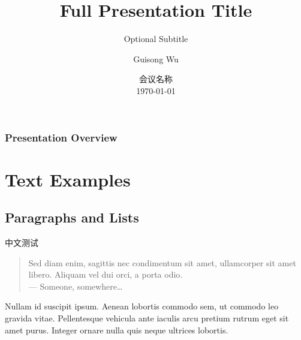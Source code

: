 \documentclass[11pt]{beamer}
\title[Short Title]{Full Presentation Title}
\subtitle{Optional Subtitle}
\author[Guisong Wu]{Guisong Wu}
\institute[AMSS]{数学与系统科学研究院 \\ \smallskip \textit{wuguisong@lsec.cc.ac.cn}}
\date[\today]{会议名称 \\ \today}
\begin{document}



\begin{frame}
	\titlepage
\end{frame}



\begin{frame}
	\frametitle{Presentation Overview}
	\tableofcontents
\end{frame}



\section{Text Examples}
\subsection{Paragraphs and Lists}
\begin{frame}{中文测试}
	\begin{quote}
		Sed diam enim, sagittis nec \alert{condimentum} sit amet, ullamcorper sit amet libero. Aliquam vel dui orci, a porta odio.\\
		--- Someone, somewhere\ldots
	\end{quote}
	\bigskip %
	Nullam id suscipit ipsum. Aenean lobortis commodo sem, ut commodo leo gravida vitae. Pellentesque vehicula ante iaculis arcu pretium rutrum eget sit amet purus. Integer ornare nulla quis neque ultrices lobortis.
\end{frame}
\end{document}
